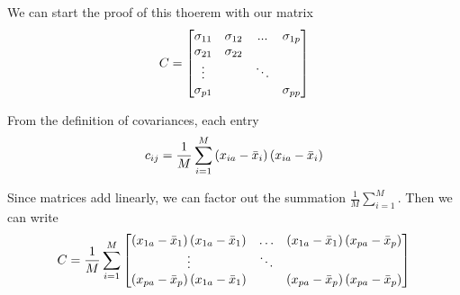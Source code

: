 \documentclass[12pt]{report}
\begin{document}
            \begin{myproof}
                We can start the proof of this thoerem with our matrix
                \[
                    C = \begin{bmatrix}
                        \sigma_{11} & \sigma_{12} & ...    & \sigma_{1p} \\
                        \sigma_{21} & \sigma_{22} &        &             \\
                        \vdots      &             & \ddots &             \\
                        \sigma_{p1} &             &        & \sigma _{pp}
                    \end{bmatrix}
                \]

                From the definition of covariances, each entry 
                    \[
                        c_{ij} = \frac{1}{M} \sum_{i=1}^M \left(x_{ia} - \bar{x}_i\right) \left(x_{ia} - \bar{x}_i\right)
                    \]
                
                Since matrices add linearly, we can factor out the summation $\frac{1}{M} \sum_{i=1}^M$. Then we can write
                    \[
                        C = \frac{1}{M} \sum_{i=1}^M \begin{bmatrix}
                            \left(x_{1a} - \bar{x}_1\right) \left(x_{1a} - \bar{x}_1\right) & \dotsc  & \left(x_{1a} - \bar{x}_1\right) \left(x_{pa} - \bar{x}_p\right) \\
                            \vdots & \ddots & \\
                            \left(x_{pa} - \bar{x}_p\right) \left(x_{1a} - \bar{x}_1\right) &  & \left(x_{pa} - \bar{x}_p\right) \left(x_{pa} - \bar{x}_p\right)
                        \end{bmatrix}
                    \] 
                

\end{myproof}
\end{document}
